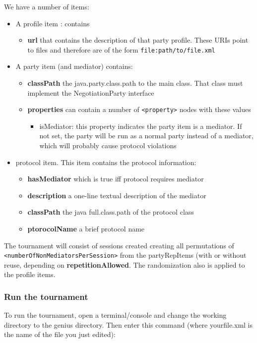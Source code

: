 \documentclass[]{article}
\begin{document}
We have a number of items:
\begin{itemize}

\item A profile item : contains 
	 \begin{itemize}
	\item \textbf{url} that contains the description of that party profile. These URIs point to files and therefore are of the form \verb|file:path/to/file.xml|
  	\end{itemize}

\item A party item  (and mediator) contains:
  \begin{itemize}
    \item \textbf{classPath} the java.party.class.path to the main class. That class must implement the NegotiationParty interface
    \item \textbf{properties} can contain a number of \verb|<property>| nodes with these values
    		\begin{itemize}
		\item isMediator: this property indicates the party item is a mediator. If not set, the party will be 
		run as a normal party instead of a mediator, which will probably cause protocol violations
		\end{itemize}
  \end{itemize}

\item protocol item. This item contains the protocol information: 
	\begin{itemize}
	\item \textbf{hasMediator} which is true iff protocol requires mediator
	\item \textbf{description} a one-line textual description of the mediator
	\item \textbf{classPath} the java full.class.path of the protocol class
	\item \textbf{ptorocolName} a brief protocol name 
	\end{itemize}
\end{itemize}



The tournament will consist of sessions created creating all permutations of \verb|<numberOfNonMediatorsPerSession>| from the partyRepItems (with or without reuse, depending on \textbf{repetitionAllowed}. The randomization also is applied to the profile items.


\subsubsection{Run the tournament}
To run the tournament, open a terminal/console and change the working directory to the genius directory.
Then enter this command (where yourfile.xml is the name of the file you just edited):
\end{document}
